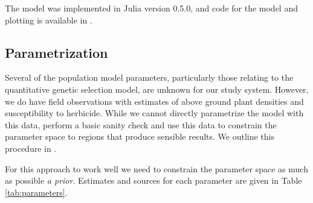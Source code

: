 \documentclass[10pt,letterpaper]{article}
\begin{document}
The model was implemented in Julia version 0.5.0, and code for the model and plotting is available in .     

\subsection*{Parametrization}
Several of the population model parameters, particularly those relating to the quantitative genetic selection model, are unknown for our study system. However, we do have field observations with estimates of above ground plant densities and susceptibility to herbicide. While we cannot directly parametrize the model with this data, perform a basic sanity check and use this data to constrain the parameter space to regions that produce sensible results. We outline this procedure in .  

For this approach to work well we need to constrain the parameter space as much as possible \textit{a prior}. Estimates and sources for each parameter are given in Table \ref{tab:parameters}.          
\end{document}
